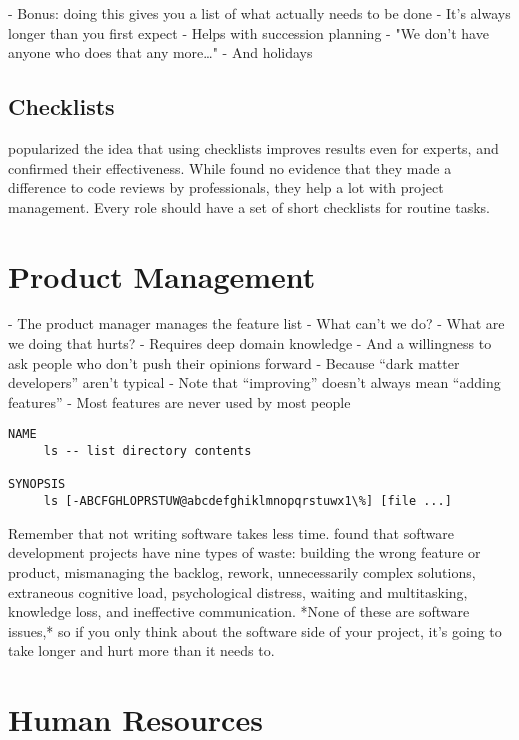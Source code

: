 \documentclass[10pt,letterpaper]{article}
\begin{document}
- Bonus: doing this gives you a list of what actually needs to be done
  - It's always longer than you first expect
- Helps with succession planning
  - "We don't have anyone who does that any more…"
- And holidays

\subsection*{Checklists}

\cite{Gawande2007} popularized the idea that using checklists improves
results even for experts, and \cite{Aveling2013,Ramsay2019} confirmed
their effectiveness. While \cite{Hatton2008} found no evidence that
they made a difference to code reviews by professionals, they help a
lot with project management. Every role should have a set of short
checklists for routine tasks.

\section{Product Management}

- The product manager manages the feature list
  - What can't we do?
  - What are we doing that hurts?
- Requires deep domain knowledge
  - And a willingness to ask people who don't push their opinions forward
  - Because ``dark matter developers'' aren't typical \cite{Hanselman2012}
- Note that ``improving'' doesn't always mean ``adding features'' \cite{Perri2018}
  - Most features are never used by most people \cite{Xu2015}

\begin{verbatim}
NAME
     ls -- list directory contents

SYNOPSIS
     ls [-ABCFGHLOPRSTUW@abcdefghiklmnopqrstuwx1\%] [file ...]
\end{verbatim}

Remember that not writing software takes less time.  \cite{Sedano2017}
found that software development projects have nine types of waste:
building the wrong feature or product, mismanaging the backlog,
rework, unnecessarily complex solutions, extraneous cognitive load,
psychological distress, waiting and multitasking, knowledge loss, and
ineffective communication.  *None of these are software issues,* so if
you only think about the software side of your project, it's going to
take longer and hurt more than it needs to.

\section{Human Resources}
\end{document}
